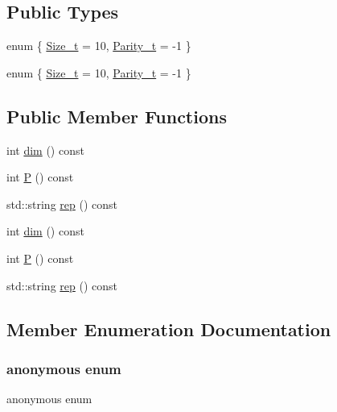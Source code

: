 \subsection*{Public Types}
\begin{DoxyCompactItemize}
\item 
enum \{ \mbox{\hyperlink{structHadron_1_1J9o2uRep_a1adb29b1f8ef5bfc67452587322c5621ab8c4bbf1065e2419eab17f614d50847b}{Size\+\_\+t}} = 10, 
\mbox{\hyperlink{structHadron_1_1J9o2uRep_a1adb29b1f8ef5bfc67452587322c5621a7b28f161b099d47f3ab7ba0e085f040e}{Parity\+\_\+t}} = -\/1
 \}
\item 
enum \{ \mbox{\hyperlink{structHadron_1_1J9o2uRep_a1adb29b1f8ef5bfc67452587322c5621ab8c4bbf1065e2419eab17f614d50847b}{Size\+\_\+t}} = 10, 
\mbox{\hyperlink{structHadron_1_1J9o2uRep_a1adb29b1f8ef5bfc67452587322c5621a7b28f161b099d47f3ab7ba0e085f040e}{Parity\+\_\+t}} = -\/1
 \}
\end{DoxyCompactItemize}
\subsection*{Public Member Functions}
\begin{DoxyCompactItemize}
\item 
int \mbox{\hyperlink{structHadron_1_1J9o2uRep_a8fe53f7193e81fb4681c5adbf89bca09}{dim}} () const
\item 
int \mbox{\hyperlink{structHadron_1_1J9o2uRep_a3aebae1f874d8463e884f81517de21a8}{P}} () const
\item 
std\+::string \mbox{\hyperlink{structHadron_1_1J9o2uRep_ac55275a024a1bfeefef8a2916dcf8a3c}{rep}} () const
\item 
int \mbox{\hyperlink{structHadron_1_1J9o2uRep_a8fe53f7193e81fb4681c5adbf89bca09}{dim}} () const
\item 
int \mbox{\hyperlink{structHadron_1_1J9o2uRep_a3aebae1f874d8463e884f81517de21a8}{P}} () const
\item 
std\+::string \mbox{\hyperlink{structHadron_1_1J9o2uRep_ac55275a024a1bfeefef8a2916dcf8a3c}{rep}} () const
\end{DoxyCompactItemize}


\subsection{Member Enumeration Documentation}
\mbox{\label{structHadron_1_1J9o2uRep_a6443a31e96ff6dca73279d2f72d83bdd}} 
\subsubsection{\texorpdfstring{anonymous enum}{anonymous enum}}
{\footnotesize\ttfamily anonymous enum}

